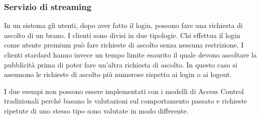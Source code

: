 \subsubsection*{Servizio di streaming}
\label{subs:Servizio di streaming}
In un sistema gli utenti, dopo aver fatto il login, possono fare una richiesta di ascolto di un brano. I clienti
sono divisi in due tipologie. Chi effettua il login come utente premium può fare richieste di ascolto senza nessuna restrizione.
I clienti stardard hanno invece un tempo limite esaurito il quale devono ascoltare la pubblicità prima di poter fare
un'altra richiesta di ascolto. In questo caso si assumono le richieste di ascolto più numerose rispetto ai login o ai logout.\par
\vspace{1em}
I due esempi non possono essere implementati con i modelli di Access Control tradizionali perché basano
le valutazioni sul comportamento passato e richieste ripetute di uno stesso tipo sono valutate
in modo differente.
